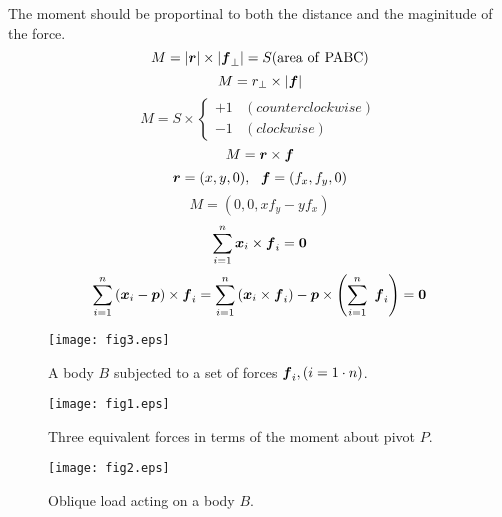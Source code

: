 \documentclass[10pt,a4j]{article}
\begin{document}
The moment should be proportinal to both the distance and the maginitude of the force. 
\begin{equation}
	M=|\mbox{\boldmath $r$}| \times |\mbox{\boldmath $f$}_{\perp}|=S({\rm area \  of \ PABC})
	\label{eqn:}
\end{equation}
\begin{equation}
	M=r_\perp \times |\mbox{\boldmath $f$}|
	\label{eqn:}
\end{equation}
\begin{equation}
	M=S \times \left\{
		\begin{array}{cc}
			+1 & (counterclockwise) \\
			-1 & (clockwise) 
		\end{array}
	\right.
	\label{eqn:}
\end{equation}
\begin{equation}
	M=\mbox{\boldmath $r$} \times \mbox{\boldmath $f$}
	\label{eqn:}
\end{equation}
\begin{equation}
	\fat{r}=(x,y,0), \ \ 
	\fat{f}=(f_x,f_y,0)
	\label{eqn:}
\end{equation}
\begin{equation}
	M=(0,0,xf_y-yf_x)
	\label{eqn:}
\end{equation}
\begin{equation}
	\sum_{i=1}^n \mbox{\boldmath $x$}_i\times \mbox{\boldmath $f$}_i
	=
	\mbox{\boldmath $0$}
	\label{eqn:}
\end{equation}
\begin{equation}
	\sum_{i=1}^n \left(\mbox{\boldmath $x$}_i-\mbox{\boldmath $p$}\right) \times \mbox{\boldmath $f$}_i
	=
	\sum_{i=1}^n \left( \mbox{\boldmath $x$}_i\times \mbox{\boldmath $f$}_i  \right)
	- 
	\mbox{\boldmath $p$} \times \left(\sum_{i=1}^n \ \mbox{\boldmath $f$}_i \right)
	=\mbox{\boldmath $0$}
	\label{eqn:}
\end{equation}
\begin{figure}[h]
	\begin{center}
	\texttt{[image: fig3.eps]} 
	\end{center}
	\caption{A body $B$ subjected to a set of forces $\mbox{\boldmath $f$}_i,(i=1\cdot n)$.} 
	\label{fig:fig3}
\end{figure}
\begin{figure}[h]
	\begin{center}
	\texttt{[image: fig1.eps]} 
	\end{center}
	\caption{Three equivalent forces in terms of the moment about pivot $P$.} 
	\label{fig:fig1}
\end{figure}
\begin{figure}[h]
	\begin{center}
	\texttt{[image: fig2.eps]} 
	\end{center}
	\caption{Oblique load acting on a body $B$.} 
	\label{fig:fig2}
\end{figure}
\end{document}

